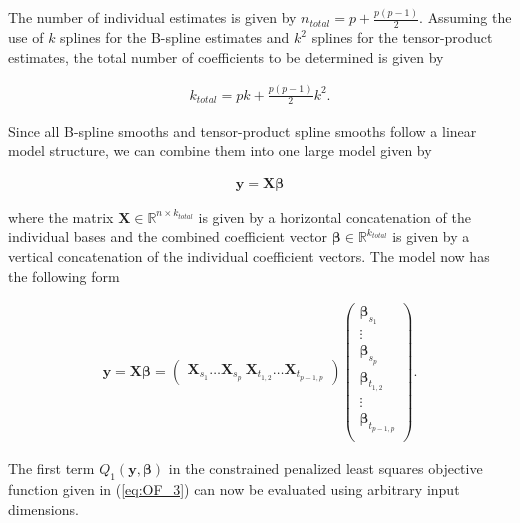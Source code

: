 \documentclass[10pt,a4paper]{article}
\begin{document}
	The number of individual estimates is given by $n_{total} = p + \frac{p(p-1)}{2}$.  \cite{fahrmeir2013regression} Assuming the use of $k$ splines for the B-spline estimates and $k^2$ splines for the tensor-product estimates, the total number of coefficients to be determined is given by 
	
	\begin{align}\label{eq:tps_total_number_of_coef}
		k_{total} = pk + \frac{p(p-1)}{2}k^2. 
	\end{align}
	
	Since all B-spline smooths and tensor-product spline smooths follow a linear model structure, we can combine them into one large model given by
	
	\begin{align}\label{eq:tps_lin_mod}
		\boldsymbol{y} = \boldsymbol{X} \boldsymbol{\beta}
	\end{align}
		
	where the matrix $\boldsymbol{X} \in \mathbb{R}^{n \times k_{total}}$ is given by a horizontal concatenation of the individual bases and the combined coefficient vector $\boldsymbol{\beta} \in \mathbb{R}^{k_{total}}$ is given by a vertical concatenation of the individual coefficient vectors. The model now has the following form
		
	\begin{align}\label{eq:tps_lin_model_verbose}
		\boldsymbol{y} = \boldsymbol{X} \boldsymbol{\beta} = 
					\begin{pmatrix} \boldsymbol{X}_{s_1} \dots \boldsymbol{X}_{s_p} \ \boldsymbol{X}_{t_{1,2}} \dots \boldsymbol{X}_{t_{p-1,p}} \end{pmatrix} 
					\begin{pmatrix} \boldsymbol{\beta}_{s_1} \\ 
									\vdots  \\ 
									\boldsymbol{\beta}_{s_p} \\ 
									\boldsymbol{\beta}_{t_{1,2}} \\ 
									\vdots \\ 
									\boldsymbol{\beta}_{t_{p-1,p}} \\
					\end{pmatrix}.
	\end{align}
	
	The first term $Q_1(\boldsymbol{y}, \boldsymbol{\beta})$ in the constrained penalized least squares objective function given in (\ref{eq:OF_3}) can now be evaluated using arbitrary input dimensions. 
	
\end{document}
